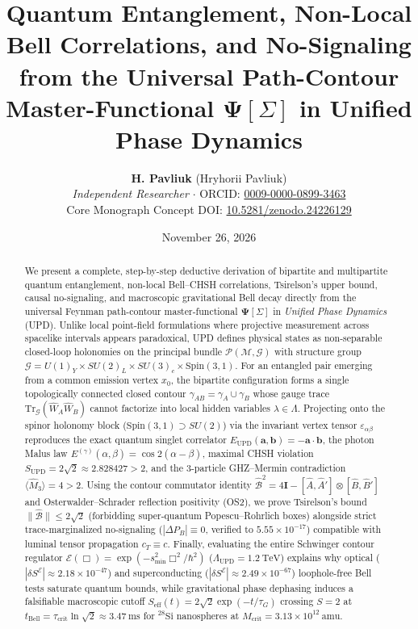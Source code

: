 \documentclass[11pt,a4paper]{article}
\title{\textbf{Quantum Entanglement, Non-Local Bell Correlations, and No-Signaling from the Universal Path-Contour Master-Functional $\mathbf{\Psi}[\Sigma]$ in Unified Phase Dynamics}}
\author{\textbf{H. Pavliuk} (Hryhorii Pavliuk)\\
\textit{Independent Researcher} \quad $\cdot$ \quad ORCID: \href{https://orcid.org/0009-0000-0899-3463}{0009-0000-0899-3463}\\
\small Core Monograph Concept DOI: \href{https://doi.org/10.5281/zenodo.24226129}{10.5281/zenodo.24226129}}
\date{November 26, 2026}
\begin{document}
\maketitle

\begin{abstract}
We present a complete, step-by-step deductive derivation of bipartite and multipartite quantum entanglement, non-local Bell--CHSH correlations, Tsirelson's upper bound, causal no-signaling, and macroscopic gravitational Bell decay directly from the universal Feynman path-contour master-functional $\mathbf{\Psi}[\Sigma]$ in \textit{Unified Phase Dynamics} (UPD). Unlike local point-field formulations where projective measurement across spacelike intervals appears paradoxical, UPD defines physical states as non-separable closed-loop holonomies on the principal bundle $\mathcal{P}(\mathcal{M}, \mathcal{G})$ with structure group $\mathcal{G} = U(1)_Y \times SU(2)_L \times SU(3)_c \times \mathrm{Spin}(3,1)$. For an entangled pair emerging from a common emission vertex $x_0$, the bipartite configuration forms a single topologically connected closed contour $\gamma_{AB} = \gamma_A \cup \gamma_B$ whose gauge trace $\mathrm{Tr}_{\mathcal{G}}(\hat{W}_A \hat{W}_B)$ cannot factorize into local hidden variables $\lambda \in \Lambda$. Projecting onto the spinor holonomy block ($\mathrm{Spin}(3,1) \supset SU(2)$) via the invariant vertex tensor $\varepsilon_{\alpha\beta}$ reproduces the exact quantum singlet correlator $E_{\mathrm{UPD}}(\mathbf{a},\mathbf{b}) = -\mathbf{a}\cdot\mathbf{b}$, the photon Malus law $E^{(\gamma)}(\alpha,\beta) = \cos 2(\alpha-\beta)$, maximal CHSH violation $S_{\mathrm{UPD}} = 2\sqrt{2} \approx 2.828427 > 2$, and the 3-particle GHZ--Mermin contradiction $\langle\hat{M}_3\rangle = 4 > 2$. Using the contour commutator identity $\hat{\mathcal{B}}^2 = 4\mathbf{I} - [\hat{A},\hat{A}']\otimes[\hat{B},\hat{B}']$ and Osterwalder--Schrader reflection positivity (OS2), we prove Tsirelson's bound $\|\hat{\mathcal{B}}\| \le 2\sqrt{2}$ (forbidding super-quantum Popescu--Rohrlich boxes) alongside strict trace-marginalized no-signaling ($|\Delta P_B| \equiv 0$, verified to $5.55 \times 10^{-17}$) compatible with luminal tensor propagation $c_T \equiv c$. Finally, evaluating the entire Schwinger contour regulator $\mathcal{E}(\Box) = \exp(-s_{\min}^2 \Box^2/\hbar^2)$ ($\Lambda_{\mathrm{UPD}} = 1.2\ \mathrm{TeV}$) explains why optical ($|\delta S^{\mathcal{E}}| \approx 2.18 \times 10^{-47}$) and superconducting ($|\delta S^{\mathcal{E}}| \approx 2.49 \times 10^{-67}$) loophole-free Bell tests saturate quantum bounds, while gravitational phase dephasing induces a falsifiable macroscopic cutoff $S_{\mathrm{eff}}(t) = 2\sqrt{2}\exp(-t/\tau_G)$ crossing $S = 2$ at $t_{\mathrm{Bell}} = \tau_{\mathrm{crit}}\ln\sqrt{2} \approx 3.47\ \mathrm{ms}$ for $^{28}\mathrm{Si}$ nanospheres at $M_{\mathrm{crit}} = 3.13 \times 10^{12}\ \mathrm{amu}$.
\end{abstract}
\end{document}
